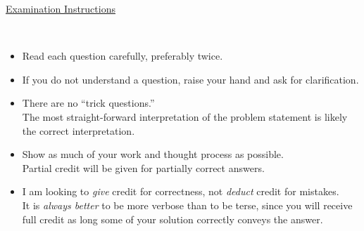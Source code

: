 \documentclass{ExamCUNY}
\newcommand{\Event}[1]{\ensuremath{\bm{\mathsf{#1}}}\xspace}
\begin{document}
\CoverPage%

\newcommand{\BulletLong}[3]{\hspace*{4mm}\ensuremath{\Parens{\Event{#1}}}:\hspace*{2mm}#2\[#3\]\\[5mm]}
\newcommand{\BulletLine}[3]{\hspace*{4mm}\ensuremath{\Parens{\Event{#1}}}:\hspace*{2mm}#2\hfill\ensuremath{#3}\\[5mm]}
\newcommand{\Bullet}[2]{\hspace*{4mm}\ensuremath{\Parens{\Event{#1}}}:\hspace*{2mm}#2\\[5mm]}

\newcommand{\True}{\ensuremath{\bm{\mathtt{True}}}\xspace}
\newcommand{\False}{\ensuremath{\bm{\mathtt{False}}}\xspace}

\newcommand{\TrueFalse}[1]{\ensuremath{\True\;\oplus\;\False\;\colon~~{#1}}}

\newcommand{\SupportFalsify}[1]{\ensuremath{\mathtt{Support}\;\oplus\;\mathtt{Falsify}\;\colon~~{#1}}}




\clearpage%
%  
\begin{center}
{\Huge \underline{Examination Instructions}}
\end{center}
~\vspace*{5mm}
{\Large
\begin{itemize}
\item Read each question carefully, preferably twice.
\item If you do not understand a question, raise your hand and ask for clarification.
\item There are no ``trick questions.''\\
The most straight-forward interpretation of the problem statement is likely the correct interpretation.
\item Show as much of your work and thought process as possible.\\
Partial credit will be given for partially correct answers.
\item I am looking to \emph{give} credit for correctness, not \emph{deduct} credit for mistakes.\\
It is \emph{always better} to be more verbose than to be terse, since you will receive full credit as long some of your solution correctly conveys the answer.
\end{itemize}
}
\end{document}
